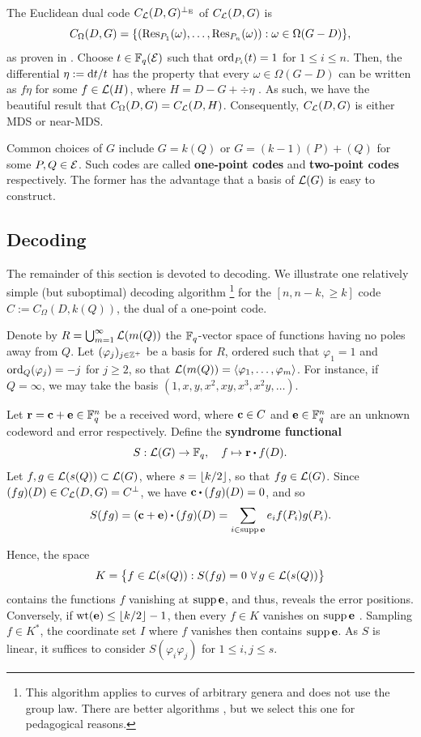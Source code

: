 \documentclass[twocolumn, 11pt]{scrartcl}
\begin{document}
The Euclidean dual code $C_\mathcal{L}(D,G)^{\perp_\mathrm{E}}$ of $C_\mathcal{L}(D,G)$ is
\[ C_\Omega(D,G)=\set*{(\Res_{P_1}(\omega),\hdots,\Res_{P_n}(\omega)):\omega\in\Omega(G-D)}, \]
as proven in \cite[Prop.~8]{o2008key}. Choose $t\in\mathbb{F}_q(\mathcal{E})$ such that $\operatorname{ord}_{P_i}(t)=1$ for $1\leq i\leq n$. Then, the differential $\eta:=\mathrm{d} t/t$ has the property that every $\omega\in\Omega(G-D)$ can be written as $f\eta$ for some $f\in\mathcal{L}(H)$, where $H=D-G+\div\eta$ \cite[\S8.1]{stichtenoth2009algebraic}. As such, we have the beautiful result that $C_\Omega(D,G)=C_\mathcal{L}(D,H)$. Consequently, $C_\mathcal{L}(D,G)$ is either MDS or near-MDS.

Common choices of $G$ include $G=k(Q)$ or $G=(k-1)(P)+(Q)$ for some $P,Q\in\mathcal{E}$. Such codes are called \textbf{one-point codes} and \textbf{two-point codes} respectively. The former has the advantage that a basis of $\mathcal{L}(G)$ is easy to construct.

\subsection{Decoding}

The remainder of this section is devoted to decoding. We illustrate one relatively simple (but suboptimal) decoding algorithm \cite[\S6.2]{hoholdt1998algebraic}\footnote{This algorithm applies to curves of arbitrary genera and does not use the group law. There are better algorithms \cite{hoholdt1995decoding,o2008key}, but we select this one for pedagogical reasons.} for the $[n,n-k,\geq\!k]$ code $C:=C_\Omega(D,k(Q))$, the dual of a one-point code.

Denote by $R=\bigcup_{m=1}^\infty \mathcal{L}(m(Q))$ the $\mathbb{F}_q$-vector space of functions having no poles away from $Q$. Let $(\varphi_j)_{j\in\mathbb{Z}^+}$ be a basis for $R$, ordered such that $\varphi_1=1$ and $\operatorname{ord}_Q(\varphi_j)=-j$ for $j\geq2$, so that $\mathcal{L}(m(Q))=\langle\varphi_1,\hdots,\varphi_m\rangle$. For instance, if $Q=\infty$, we may take the basis $(1,x,y,x^2,xy,x^3,x^2y,\hdots)$.

Let $\mathbf{r}=\mathbf{c}+\mathbf{e}\in\mathbb{F}_q^n$ be a received word, where $\mathbf{c}\in C$ and $\mathbf{e}\in\mathbb{F}_q^n$ are an unknown codeword and error respectively. Define the \textbf{syndrome functional}
\[ S:\mcL(G)\to\bbF_q, \quad f\mapsto\bfr\dotpr f(D). \]
Let $f,g\in\mathcal{L}(s(Q))\subset\mathcal{L}(G)$, where $s=\lfloor k/2\rfloor$, so that $fg\in\mathcal{L}(G)$. Since $(fg)(D)\in C_\mathcal{L}(D,G)=C^\perp$, we have $\bfc\dotpr (fg)(D)=0$, and so
\[ S(fg)=(\bfc+\bfe)\dotpr (fg)(D)=\sum_{i\in\supp\bfe} e_if(P_i)g(P_i). \]

\vspace{-1.9em}
Hence, the space
\[ K=\set[\big]{f\in\mcL(s(Q)):S(fg)=0\ \forall g\in \mcL(s(Q))} \]
contains the functions $f$ vanishing at $\operatorname{supp}\mathbf{e}$, and thus, reveals the error positions. Conversely, if $\operatorname{wt}(\mathbf{e})\leq\lfloor k/2\rfloor-1$, then every $f\in K$ vanishes on $\operatorname{supp}\mathbf{e}$ \cite[\S6.2]{hoholdt1998algebraic}. Sampling $f\in K^*$, the coordinate set $I$ where $f$ vanishes then contains $\operatorname{supp}\mathbf{e}$. As $S$ is linear, it suffices to consider $S(\varphi_i\varphi_j)$ for $1\leq i,j\leq s$.
\end{document}
